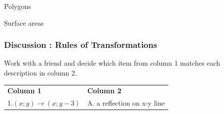 \begin{exercises}{Polygons}
\begin{exercises}{Surface areas }
\begin{figure}[H]
\begin{center}
    \end{center}

 \end{figure}   

    \addtocounter{footnote}{-0}
    
          \par 
\label{m39358*secfhsst!!!underscore!!!id2730}
            \subsubsection{  Discussion : Rules of Transformations }
            \nopagebreak
            
          \label{m39358*id72588}Work with a friend and decide which item from column 1 matches each description in column 2.\par 
          
    
          \begin{table}[H]
        
    
        \begin{center}
      
      \label{m39358*id72595}
      
      \begin{xtabular}[t]{|l|l|}\hline
    
    
        
                    \textbf{Column 1}
                   &
    
    
        
                    \textbf{Column 2}
     \tabularnewline{}
    
    
        1.$\left(x;y\right)\to \left(x;y-3\right)$        &
    
    
        A. a reflection on x-y line%
     \tabularnewline{}
    

\end{xtabular}
\end{center}
\end{table}
\end{exercises}
\end{exercises}
